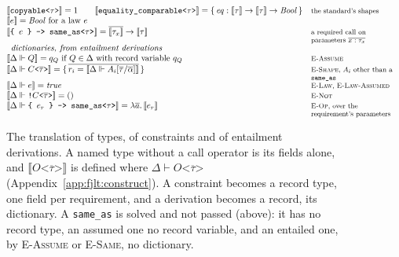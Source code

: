 \begin{figure}[htbp]
\[\begin{array}{@{}l@{\quad}l@{}}
\llbracket \texttt{copyable<}\tau\texttt{>} \rrbracket = 1 \qquad \llbracket \texttt{equality\_comparable<}\tau\texttt{>} \rrbracket = \{\,\mathit{eq} : \llbracket \tau \rrbracket \to \llbracket \tau \rrbracket \to \mathit{Bool}\,\} & \note{the standard's shapes} \\
\llbracket e \rrbracket = \mathit{Bool} \text{ for a law } e & \\
\llbracket \texttt{\{ }e\texttt{ \} -> same\_as<}\tau\texttt{>} \rrbracket = \overline{\llbracket \tau_x \rrbracket} \to \llbracket \tau \rrbracket & \note{a required call on parameters $\overline{x : \tau_x}$} \\[6pt]
\multicolumn{2}{l}{\textit{dictionaries, from entailment derivations}} \\
\llbracket \Delta \Vdash Q \rrbracket = q_Q \text{ if } Q \in \Delta \text{ with record variable } q_Q & \note{\textsc{E-Assume}} \\
\llbracket \Delta \Vdash C\texttt{<}\overline{\tau}\texttt{>} \rrbracket = \{\,\overline{r_i = \llbracket \Delta \Vdash A_i[\overline{\tau}/\overline{\alpha}] \rrbracket}\,\} & \note{\textsc{E-Shape}, $A_i$ other than a \texttt{same\_as}} \\
\llbracket \Delta \Vdash e \rrbracket = \mathit{true} & \note{\textsc{E-Law}, \textsc{E-Law-Assumed}} \\
\llbracket \Delta \Vdash \texttt{!}C\texttt{<}\overline{\tau}\texttt{>} \rrbracket = () & \note{\textsc{E-Not}} \\
\llbracket \Delta \Vdash \texttt{\{ }e_r\texttt{ \} -> same\_as<}\tau\texttt{>} \rrbracket = \lambda\overline{a}.\,\llbracket e_r \rrbracket & \note{\textsc{E-Op}, over the requirement's parameters} \\
\end{array}
\]
\caption{The translation of types, of constraints and of entailment derivations.
A named type without a call operator is its fields alone, and $\llbracket O\texttt{<}\overline{\tau}\texttt{>} \rrbracket$ is defined where $\Delta \vdash O\texttt{<}\overline{\tau}\texttt{>}$ (Appendix~\ref{app:fjlt:construct}).
A constraint becomes a record type, one field per requirement, and a derivation becomes a record, its dictionary.
A \texttt{same\_as} is solved and not passed (above): it has no record type, an assumed one no record variable, and an entailed one, by \textsc{E-Assume} or \textsc{E-Same}, no dictionary.}
\label{fig:fjlt-types}
\label{fig:fjlt-records}
\label{fig:fjlt-dictionaries}
\end{figure}

